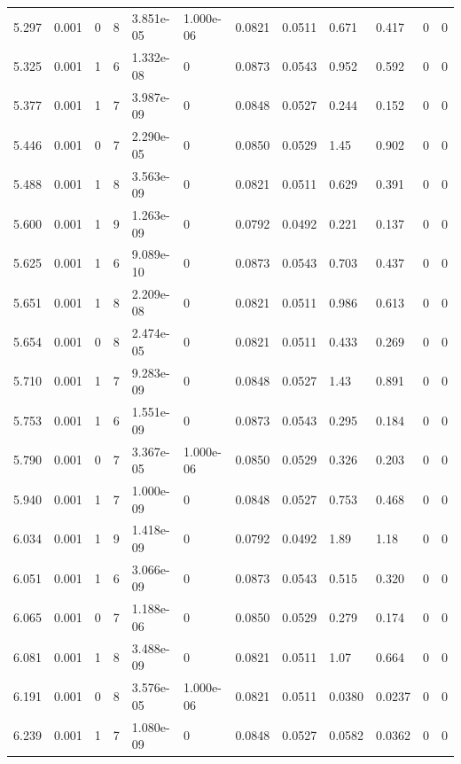 \documentclass[preview]{standalone}
\begin{document}
{{{{\begin{tabular}{L{1.2cm}C{1.2cm} C{0.3cm}C{0.5cm} C{1.4cm}C{1.4cm} C{1.4cm}C{1.4cm} C{1.6cm}C{1.6cm} C{1.6cm}C{1.6cm}}
  5.297  &  0.001  & 0     &  8 &  3.851e-05  & 1.000e-06  &  0.0821&   0.0511& 0.671 & 0.417   &  0 & 0  \\ 
  5.325  &  0.001  & 1     &  6 &  1.332e-08  & 0  &  0.0873&   0.0543& 0.952 & 0.592   &  0 & 0  \\ 
  5.377  &  0.001  & 1     &  7 &  3.987e-09  & 0  &  0.0848&   0.0527& 0.244 & 0.152   &  0 & 0  \\ 
  5.446  &  0.001  & 0     &  7 &  2.290e-05  & 0  &  0.0850&   0.0529& 1.45 & 0.902   &  0 & 0  \\ 
  5.488  &  0.001  & 1     &  8 &  3.563e-09  & 0  &  0.0821&   0.0511& 0.629 & 0.391   &  0 & 0  \\ 
  5.600  &  0.001  & 1     &  9 &  1.263e-09  & 0  &  0.0792&   0.0492& 0.221 & 0.137   &  0 & 0  \\ 
  5.625  &  0.001  & 1     &  6 &  9.089e-10  & 0  &  0.0873&   0.0543& 0.703 & 0.437   &  0 & 0  \\ 
  5.651  &  0.001  & 1     &  8 &  2.209e-08  & 0  &  0.0821&   0.0511& 0.986 & 0.613   &  0 & 0  \\ 
  5.654  &  0.001  & 0     &  8 &  2.474e-05  & 0  &  0.0821&   0.0511& 0.433 & 0.269   &  0 & 0  \\ 
  5.710  &  0.001  & 1     &  7 &  9.283e-09  & 0  &  0.0848&   0.0527& 1.43 & 0.891   &  0 & 0  \\ 
  5.753  &  0.001  & 1     &  6 &  1.551e-09  & 0  &  0.0873&   0.0543& 0.295 & 0.184   &  0 & 0  \\ 
  5.790  &  0.001  & 0     &  7 &  3.367e-05  & 1.000e-06  &  0.0850&   0.0529& 0.326 & 0.203   &  0 & 0  \\ 
  5.940  &  0.001  & 1     &  7 &  1.000e-09  & 0  &  0.0848&   0.0527& 0.753 & 0.468   &  0 & 0  \\ 
  6.034  &  0.001  & 1     &  9 &  1.418e-09  & 0  &  0.0792&   0.0492& 1.89 & 1.18   &  0 & 0  \\ 
  6.051  &  0.001  & 1     &  6 &  3.066e-09  & 0  &  0.0873&   0.0543& 0.515 & 0.320   &  0 & 0  \\ 
  6.065  &  0.001  & 0     &  7 &  1.188e-06  & 0  &  0.0850&   0.0529& 0.279 & 0.174   &  0 & 0  \\ 
  6.081  &  0.001  & 1     &  8 &  3.488e-09  & 0  &  0.0821&   0.0511& 1.07 & 0.664   &  0 & 0  \\ 
  6.191  &  0.001  & 0     &  8 &  3.576e-05  & 1.000e-06  &  0.0821&   0.0511& 0.0380 & 0.0237   &  0 & 0  \\ 
  6.239  &  0.001  & 1     &  7 &  1.080e-09  & 0  &  0.0848&   0.0527& 0.0582 & 0.0362   &  0 & 0  \\ 

\end{tabular}}}}}
\end{document}
